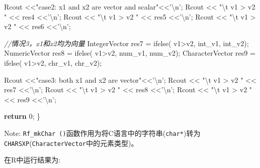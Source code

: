 \documentclass[]{ctexbook}
\newenvironment{Shaded}{\begin{snugshade}}{\end{snugshade}}
\newcommand{\DecValTok}[1]{\textcolor[rgb]{0.00,0.00,0.81}{#1}}
\newcommand{\SpecialCharTok}[1]{\textcolor[rgb]{0.00,0.00,0.00}{#1}}
\newcommand{\StringTok}[1]{\textcolor[rgb]{0.31,0.60,0.02}{#1}}
\newcommand{\CommentTok}[1]{\textcolor[rgb]{0.56,0.35,0.01}{\textit{#1}}}
\newcommand{\ControlFlowTok}[1]{\textcolor[rgb]{0.13,0.29,0.53}{\textbf{#1}}}
\newcommand{\NormalTok}[1]{#1}
\begin{document}
\begin{Shaded}
\begin{Highlighting}[]
\NormalTok{  Rcout <<}\StringTok{"case2: x1 and x2 are vector and scalar"}\NormalTok{<<}\StringTok{'}\SpecialCharTok{\textbackslash{}n}\StringTok{'}\NormalTok{;}
\NormalTok{  Rcout << }\StringTok{"}\SpecialCharTok{\textbackslash{}t}\StringTok{ v1 > v2 "}\NormalTok{ << res4 <<}\StringTok{'}\SpecialCharTok{\textbackslash{}n}\StringTok{'}\NormalTok{;}
\NormalTok{  Rcout << }\StringTok{"}\SpecialCharTok{\textbackslash{}t}\StringTok{ v1 > v2 "}\NormalTok{ << res5 <<}\StringTok{'}\SpecialCharTok{\textbackslash{}n}\StringTok{'}\NormalTok{;}
\NormalTok{  Rcout << }\StringTok{"}\SpecialCharTok{\textbackslash{}t}\StringTok{ v1 > v2 "}\NormalTok{ << res6 <<}\StringTok{'}\SpecialCharTok{\textbackslash{}n}\StringTok{'}\NormalTok{;}
  
  \CommentTok{//情况3，x1和x2均为向量}
\NormalTok{  IntegerVector   res7 = ifelse( v1>v2, int_v1, int_v2);}
\NormalTok{  NumericVector   res8 = ifelse( v1>v2, num_v1, num_v2);}
\NormalTok{  CharacterVector res9 = ifelse( v1>v2, chr_v1, chr_v2);}
  
\NormalTok{  Rcout <<}\StringTok{"case3: both x1 and x2 are vector"}\NormalTok{<<}\StringTok{'}\SpecialCharTok{\textbackslash{}n}\StringTok{'}\NormalTok{;}
\NormalTok{  Rcout << }\StringTok{"}\SpecialCharTok{\textbackslash{}t}\StringTok{ v1 > v2 "}\NormalTok{ << res7 <<}\StringTok{'}\SpecialCharTok{\textbackslash{}n}\StringTok{'}\NormalTok{;}
\NormalTok{  Rcout << }\StringTok{"}\SpecialCharTok{\textbackslash{}t}\StringTok{ v1 > v2 "}\NormalTok{ << res8 <<}\StringTok{'}\SpecialCharTok{\textbackslash{}n}\StringTok{'}\NormalTok{;}
\NormalTok{  Rcout << }\StringTok{"}\SpecialCharTok{\textbackslash{}t}\StringTok{ v1 > v2 "}\NormalTok{ << res9 <<}\StringTok{'}\SpecialCharTok{\textbackslash{}n}\StringTok{'}\NormalTok{;}
  
  \ControlFlowTok{return} \DecValTok{0}\NormalTok{;}
\NormalTok{\}}
\end{Highlighting}
\end{Shaded}

Note:
\texttt{Rf\_mkChar\ ()}函数作用为将C语言中的字符串(\texttt{char*})转为\texttt{CHARSXP}(\texttt{CharacterVector}中的元素类型)。

在R中运行结果为:
\end{document}
